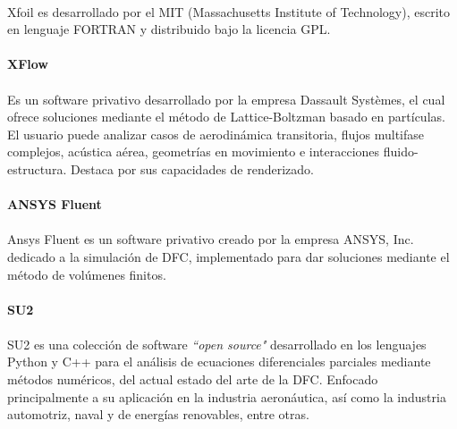 \documentclass[letterpaper, openright, 12pt]{book}
\begin{document}
				\paragraph*{}
					Xfoil es desarrollado por el MIT (Massachusetts Institute of
                    Technology), escrito en lenguaje FORTRAN y distribuido bajo
                    la licencia GPL.

				\paragraph*{XFlow}
				\paragraph*{}
					Es un software privativo desarrollado por la empresa Dassault Systèmes, el cual ofrece soluciones mediante el método de Lattice-Boltzman basado en partículas. El usuario puede analizar casos de aerodinámica transitoria, flujos multifase complejos, acústica aérea, geometrías en movimiento e interacciones fluido-estructura. Destaca por sus capacidades de renderizado.\cite{xflow}
				
				\paragraph*{ANSYS Fluent}
				\paragraph*{}
					Ansys Fluent es un software privativo creado por la empresa ANSYS, Inc. dedicado a la simulación de DFC, implementado para dar soluciones mediante el método de volúmenes finitos.
					
				\paragraph*{SU2}
				\paragraph*{}
					SU2 es una colección de software \textit{``open source"} desarrollado en los lenguajes Python y C++ para el análisis de ecuaciones diferenciales parciales mediante métodos numéricos, del actual estado del arte de la DFC. Enfocado principalmente a su aplicación en la industria aeronáutica, así como la industria automotriz, naval y de energías renovables, entre otras.\cite{SU2}

\end{document}

